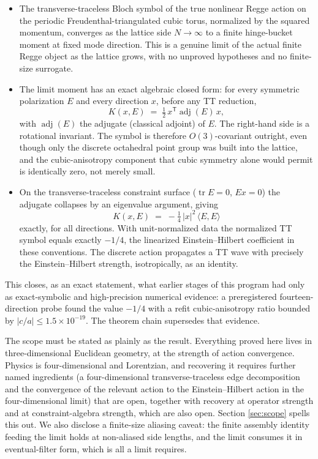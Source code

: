 \documentclass[11pt]{article}
\theoremstyle{definition}
\theoremstyle{remark}
\DeclareMathOperator{\adjE}{adj}
\DeclareMathOperator{\tr}{tr}
\newcommand{\trans}{\mathsf{T}}
\begin{document}
\begin{itemize}
\item[(A)] The transverse-traceless Bloch symbol of the true nonlinear Regge action on the periodic Freudenthal-triangulated cubic torus, normalized by the squared momentum, converges as the lattice side $N\to\infty$ to a finite hinge-bucket moment at fixed mode direction. This is a genuine limit of the actual finite Regge object as the lattice grows, with no unproved hypotheses and no finite-size surrogate.
\item[(B)] The limit moment has an exact algebraic closed form: for every symmetric polarization $E$ and every direction $x$, before any TT reduction,
\begin{equation}
K(x,E) \;=\; \tfrac12\, x^{\trans}\adjE(E)\, x,
\label{eq:adjintro}
\end{equation}
with $\adjE(E)$ the adjugate (classical adjoint) of $E$. The right-hand side is a rotational invariant. The symbol is therefore $O(3)$-covariant outright, even though only the discrete octahedral point group was built into the lattice, and the cubic-anisotropy component that cubic symmetry alone would permit is identically zero, not merely small.
\item[(C)] On the transverse-traceless constraint surface ($\tr E = 0$, $Ex = 0$) the adjugate collapses by an eigenvalue argument, giving
\begin{equation}
K(x,E) \;=\; -\tfrac14\,|x|^2\,\langle E,E\rangle
\label{eq:isointro}
\end{equation}
exactly, for all directions. With unit-normalized data the normalized TT symbol equals exactly $-1/4$, the linearized Einstein--Hilbert coefficient in these conventions. The discrete action propagates a TT wave with precisely the Einstein--Hilbert strength, isotropically, as an identity.
\end{itemize}

This closes, as an exact statement, what earlier stages of this program had only as exact-symbolic and high-precision numerical evidence: a preregistered fourteen-direction probe found the value $-1/4$ with a refit cubic-anisotropy ratio bounded by $|c/a|\le 1.5\times 10^{-19}$. The theorem chain supersedes that evidence.

The scope must be stated as plainly as the result. Everything proved here lives in three-dimensional Euclidean geometry, at the strength of action convergence. Physics is four-dimensional and Lorentzian, and recovering it requires further named ingredients (a four-dimensional transverse-traceless edge decomposition and the convergence of the relevant action to the Einstein--Hilbert action in the four-dimensional limit) that are open, together with recovery at operator strength and at constraint-algebra strength, which are also open. Section \ref{sec:scope} spells this out. We also disclose a finite-size aliasing caveat: the finite assembly identity feeding the limit holds at non-aliased side lengths, and the limit consumes it in eventual-filter form, which is all a limit requires.
\end{document}
